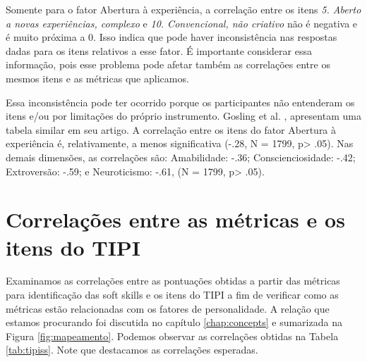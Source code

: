 Somente para o fator Abertura à experiência, a correlação entre os itens \textit{5. Aberto a novas experiências, complexo} e \textit{10. Convencional, não criativo} não é negativa e é muito próxima a 0. Isso indica que pode haver inconsistência nas respostas dadas para os itens relativos a esse fator.
É importante considerar essa informação, pois esse problema pode afetar também as correlações entre os mesmos itens e as métricas que aplicamos.

Essa inconsistência pode ter ocorrido porque os participantes não entenderam os itens e/ou por limitações do próprio instrumento. Gosling et al. \cite{gosling:03}, apresentam uma tabela similar em seu artigo. A correlação entre os itens do fator Abertura à experiência é, relativamente, a menos significativa (-.28, N = 1799, p> .05).
Nas demais dimensões, as correlações são: Amabilidade: -.36; Conscienciosidade: -.42; Extroversão: -.59; e Neuroticismo: -.61, (N = 1799, p> .05).

\section{Correlações entre as métricas e os itens do TIPI}
\label{sec:tipiss}

Examinamos as correlações entre as pontuações obtidas a partir das métricas para identificação das soft skills e os itens do TIPI a fim de verificar como as métricas estão relacionadas com os fatores de personalidade. A relação que estamos procurando foi discutida no capítulo \ref{chap:concepts} e sumarizada na Figura \ref{fig:mapeamento}.
Podemos observar as correlações obtidas na Tabela \ref{tab:tipiss}. Note que destacamos as correlações esperadas. 


